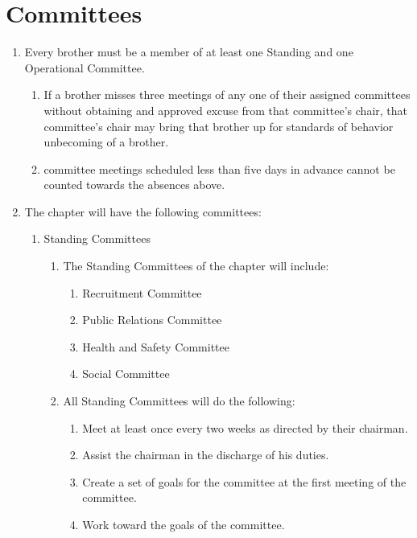 \section{Committees}
\label{committees}

\begin{enumerate}
	\item Every brother must be a member of at least one Standing and one Operational Committee.
    \begin{enumerate}
        \item If a brother misses three meetings of any one of their assigned committees without obtaining and approved excuse from that committee's chair, that committee's chair may bring that brother up for standards of behavior unbecoming of a brother.
        \item committee meetings scheduled less than five days in advance cannot be counted towards the absences above.
    \end{enumerate}
	\item The chapter will have the following committees:
		\begin{enumerate}
			\item Standing Committees \label{standing-comm}
				\begin{enumerate}
					\item The Standing Committees of the chapter will include:

						\begin{enumerate}
							\item Recruitment Committee
							\item Public Relations Committee
							\item Health and Safety Committee
							\item Social Committee
						\end{enumerate}

					\item All Standing Committees will do the following:
						\begin{enumerate}
							\item Meet at least once every two weeks as directed by their chairman.
							\item Assist the chairman in the discharge of his duties.
							\item Create a set of goals for the committee at the first meeting of the committee.
							\item Work toward the goals of the committee.
						\end{enumerate}
				\end{enumerate}


\end{enumerate}
\end{enumerate}
